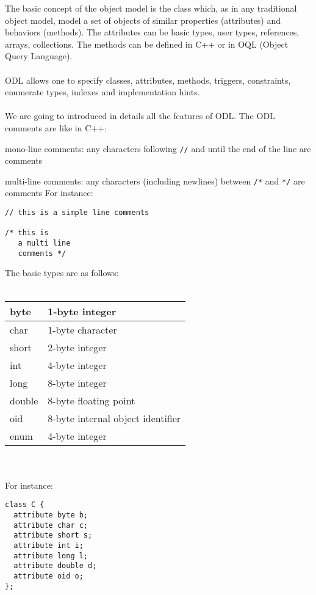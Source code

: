 
The basic concept of the \eyedb object model is the class which, as in any
traditional object model, model a set
of objects of similar properties (attributes) and behaviors (methods).
The attributes can be basic types, user types, references, arrays, collections.
The methods can be defined in C++ or in OQL (Object Query Language).
\\
\\
ODL allows one to specify classes, attributes, methods, triggers, constraints,
enumerate types, indexes and implementation hints.
\\
\\
We are going to introduced in details all the features of ODL.
The ODL comments are like in C++:
\bi
\item mono-line comments: any characters following \texttt{//} and until
the end of the line are comments
\item multi-line comments: any characters (including newlines) between \texttt{/*} and \texttt{*/}
are comments
\ei
For instance:
\vspace{-2mm}
\begin{verbatim}
// this is a simple line comments

/* this is
   a multi line
   comments */
\end{verbatim}
The basic types are as follows:\\\\
\begin{tabular}{|p{2cm}|p{5cm}|}
\hline
byte & 1-byte integer \\
\hline
char & 1-byte character \\
\hline
short & 2-byte integer \\
\hline
int & 4-byte integer \\
\hline
long & 8-byte integer \\
\hline
double & 8-byte floating point \\
\hline
oid & 8-byte internal object identifier \\
\hline
enum & 4-byte integer \\
\hline
\end{tabular}
\\
\\
For instance:
\vspace{-0.2cm}
\begin{verbatim}
class C {
  attribute byte b;
  attribute char c;
  attribute short s;
  attribute int i;
  attribute long l;
  attribute double d;
  attribute oid o;
};
\end{verbatim}
